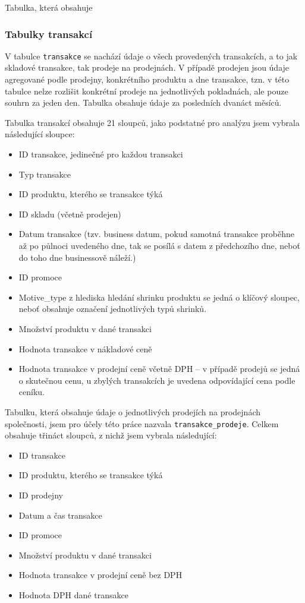 Tabulka, která obsahuje 

\subsubsection{Tabulky transakcí}
V tabulce \texttt{transakce} se nachází údaje o všech provedených transakcích, a to jak skladové transakce, tak prodeje na prodejnách. V případě prodejen jsou údaje agregované podle prodejny, konkrétního produktu a dne transakce, tzn. v této tabulce nelze rozlišit konkrétní prodeje na jednotlivých pokladnách, ale pouze souhrn za jeden den. Tabulka obsahuje údaje za posledních dvanáct měsíců.

Tabulka transakcí obsahuje 21 sloupců, jako podstatné pro analýzu jsem vybrala následující sloupce:

\begin{itemize}
    \item ID transakce, jedinečné pro každou transakci
    \item Typ transakce
    \item ID produktu, kterého se transakce týká
    \item ID skladu (včetně prodejen)
    \item Datum transakce (tzv. business datum, pokud samotná transakce proběhne až po půlnoci uvedeného dne, tak se posílá s datem z předchozího dne, neboť do toho dne businessově náleží.)
    \item ID promoce 
    \item Motive\_type z hlediska hledání shrinku produktu se jedná o klíčový sloupec, neboť obsahuje označení jednotlivých typů shrinků.
    \item Množství produktu v dané transakci
    \item Hodnota transakce v nákladové ceně
    \item Hodnota transakce v prodejní ceně včetně DPH -- v případě prodejů se jedná o skutečnou cenu, u zbylých transakcích je uvedena odpovídající cena podle ceníku.
\end{itemize}

Tabulku, která obsahuje údaje o jednotlivých prodejích na prodejnách společnosti, jsem pro účely této práce nazvala \texttt{transakce\_prodeje}. Celkem obsahuje třináct sloupců, z nichž jsem vybrala následující:

\begin{itemize}
    \item ID transakce
    \item ID produktu, kterého se transakce týká
    \item ID prodejny
    \item Datum a čas transakce 
    \item ID promoce
    \item Množství produktu v dané transakci
    \item Hodnota transakce v prodejní ceně bez DPH
    \item Hodnota DPH dané transakce
\end{itemize}

